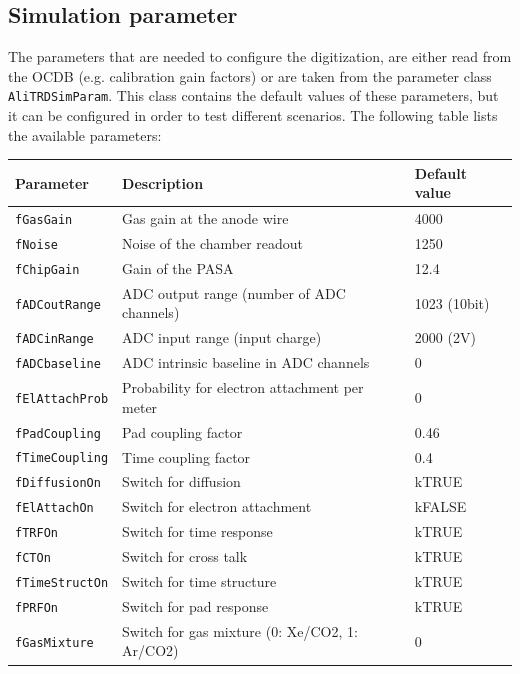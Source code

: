 \documentclass{alicetdr}
\begin{document}
\subsection{Simulation parameter}
%
The parameters that are needed to configure the digitization, are either
read from the OCDB (e.g. calibration gain factors) or are taken from the
parameter class {\tt AliTRDSimParam}. This class contains the default values
of these parameters, but it can be configured in order to test different
scenarios. The following table lists the available parameters:
%
\begin{center}
\begin{tabular}{lll}
Parameter              & Description                                   & Default value \\ \hline
{\tt fGasGain}         & Gas gain at the anode wire                    & 4000          \\
{\tt fNoise}           & Noise of the chamber readout                  & 1250          \\
{\tt fChipGain}        & Gain of the PASA                              & 12.4          \\
{\tt fADCoutRange}     & ADC output range (number of ADC channels)     & 1023 (10bit)  \\
{\tt fADCinRange}      & ADC input range (input charge)                & 2000 (2V)     \\
{\tt fADCbaseline}     & ADC intrinsic baseline in ADC channels        & 0             \\
{\tt fElAttachProb}    & Probability for electron attachment per meter & 0             \\
{\tt fPadCoupling}     & Pad coupling factor                           & 0.46          \\
{\tt fTimeCoupling}    & Time coupling factor                          & 0.4           \\ \hline
{\tt fDiffusionOn}     & Switch for diffusion                          & kTRUE         \\
{\tt fElAttachOn}      & Switch for electron attachment                & kFALSE        \\
{\tt fTRFOn}           & Switch for time response                      & kTRUE         \\
{\tt fCTOn}            & Switch for cross talk                         & kTRUE         \\
{\tt fTimeStructOn}    & Switch for time structure                     & kTRUE         \\
{\tt fPRFOn}           & Switch for pad response                       & kTRUE         \\
{\tt fGasMixture}      & Switch for gas mixture (0: Xe/CO2, 1: Ar/CO2) & 0             \\
\end{tabular}
\end{center}
%
\end{document}
